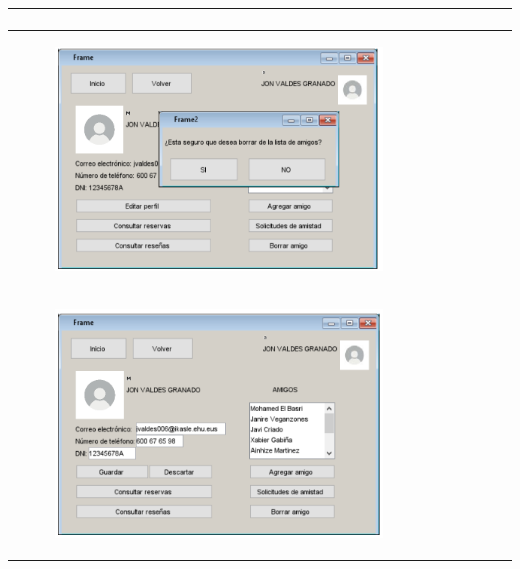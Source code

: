 \documentclass{report}
\begin{document}
\begin{center}
\begin{longtable}{|p{\linewidth}|}
\begin{figure}[H]
                        \end{figure}\\
                        \hline
                        \begin{figure}[H]
                            \centering
                            \includegraphics[width=0.8\textwidth]{./img/grafico/interfazAlertaBorrarAmigo.png}
                        \end{figure}\\
                        \begin{figure}[H]
                            \centering
                            \includegraphics[width=0.8\textwidth]{./img/grafico/InterfazEditarPerfil.png}
                        \end{figure}\\
                    \end{longtable}
                \end{center}
                \clearpage
\end{document}

